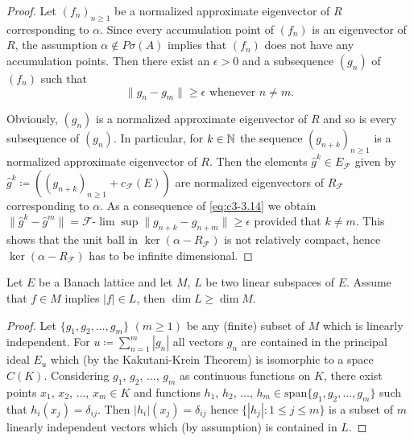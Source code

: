 	\begin{proof}
		Let $(f_{n})_{n\geq 1}$ be a normalized approximate eigenvector of $R$ corresponding to $\alpha$.
		Since every accumulation point of $(f_{n})$ is an eigenvector of $R$, the assumption $\alpha \notin P\sigma(A)$ implies that $(f_{n})$ does not have any accumulation points.
		Then there exist an $\epsilon > 0$ and a subsequence $(g_{n})$ of $(f_{n})$ such that
		\begin{equation}\label{eq:c3-3.14}
			\|g_{n} - g_{m}\| \geq \epsilon \text{ whenever } n \neq m.
		\end{equation}
		
		Obviously, $(g_{n})$ is a normalized approximate eigenvector of $R$ and so is every subsequence of $(g_{n})$.
		In particular, for $k \in \mathbb{N}$ the sequence $(g_{n+k})_{n\geq 1}$ is a normalized approximate eigenvector of $R$.
		Then the elements $\hat{g}^{k} \in E_{\mathcal{F}}$ given by $\hat{g}^{k} \coloneqq ((g_{n+k})_{n\geq 1} + c_{\mathcal{F}}(E))$ are normalized eigenvectors of $R_{\mathcal{F}}$ corresponding to $\alpha$.
		As a consequence of \eqref{eq:c3-3.14} we obtain
		$\|\hat{g}^{k} - \hat{g}^{m}\| = \mathcal{F}\text{-}\lim\sup\|g_{n+k} - g_{n+m}\| \geq \epsilon$ provided that $k \neq m$.
		This shows that the unit ball in $\ker(\alpha - R_{\mathcal{F}})$ is not relatively compact, hence $\ker(\alpha - R_{\mathcal{F}})$ has to be infinite dimensional.
	\end{proof}


\begin{lemma}\label{lem:c3-3.11}
	
	Let $E$ be a Banach lattice and let $M$, $L$ be two linear subspaces of $E$.
	Assume that $f \in M$ implies $|f| \in L$, then $\dim L \geq \dim M$.
\end{lemma}
	\begin{proof}
		Let $\{g_{1},g_{2},\ldots,g_{m}\}$ $(m\geq 1)$ be any (finite) subset of $M$ which is linearly independent.
		For $u \coloneqq \sum_{n=1}^{m}|g_{n}|$ all vectors $g_{n}$ are contained in the principal ideal $E_{u}$ which (by the Kakutani-Krein Theorem) is isomorphic to a space $C(K)$.
		Considering $g_{1}$, $g_{2}$, $\ldots$, $g_{m}$ as continuous functions on $K$, there exist points $x_{1}$, $x_{2}$, $\ldots$, $x_{m} \in K$ and functions $h_{1}$, $h_{2}$, $\ldots$, $h_{m} \in \mathrm{span}\{g_{1},g_{2},\ldots,g_{m}\}$ such that $h_{i}(x_{j}) = \delta_{ij}$.
		Then $|h_{i}|(x_{j}) = \delta_{ij}$ hence $\{|h_{j}| : 1\leq j\leq m\}$
%
		is a subset of $m$ linearly independent vectors which (by assumption) is contained in $L$.
	\end{proof}

